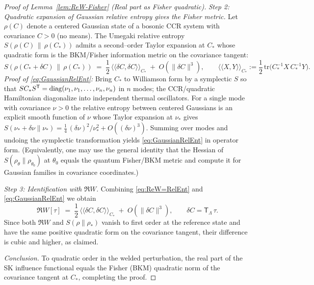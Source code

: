 \documentclass[10pt]{article}
\theoremstyle{definition}
\theoremstyle{plain}
\begin{document}
\begin{proof}[Proof of Lemma~\ref{lem:ReW-Fisher} (Real part as Fisher quadratic)]
\smallskip
\noindent
\emph{Step 2: Quadratic expansion of Gaussian relative entropy gives the Fisher metric.}
Let $\rho(C)$ denote a centered Gaussian state of a bosonic CCR system with covariance $C>0$ (no means). The Umegaki relative entropy $S(\rho(C)\,\|\,\rho(C_\ast))$ admits a second–order Taylor expansion at $C_\ast$ whose quadratic form is the BKM/Fisher information metric on the covariance tangent:
\begin{equation}
S(\rho(C_\ast+\delta C)\,\|\,\rho(C_\ast))
\;=\;\frac{1}{2}\,\big\langle\!\big\langle \delta C,\delta C\big\rangle\!\big\rangle_{C_\ast}
\;+\;O(\|\delta C\|^3),
\qquad
\big\langle\!\big\langle X,Y\big\rangle\!\big\rangle_{C_\ast}
:=\frac12\,\mathrm{tr}\!\big(C_\ast^{-1}X\,C_\ast^{-1}Y\big).
\label{eq:GaussianRelEnt}
\end{equation}
\emph{Proof of \eqref{eq:GaussianRelEnt}:}
Bring $C_\ast$ to Williamson form by a symplectic $S$ so that $S C_\ast S^{\sf T}=\mathrm{diag}(\nu_1,\nu_1,\dots,\nu_n,\nu_n)$ in $n$ modes; the CCR/quadratic Hamiltonian diagonalize into independent thermal oscillators. 
For a single mode with covariance $\nu>0$ the relative entropy between centered Gaussians is an explicit smooth function of $\nu$ whose Taylor expansion at $\nu_\ast$ gives
\(
S(\nu_\ast+\delta\nu\|\nu_\ast)=\tfrac{1}{4}\,(\delta\nu)^2/\nu_\ast^2+O((\delta\nu)^3).
\)
Summing over modes and undoing the symplectic transformation yields \eqref{eq:GaussianRelEnt} in operator form. (Equivalently, one may use the general identity that the Hessian of $S(\rho_\theta\|\rho_{\theta_0})$ at $\theta_0$ equals the quantum Fisher/BKM metric and compute it for Gaussian families in covariance coordinates.)

\smallskip
\noindent
\emph{Step 3: Identification with $\Re W$.}
Combining \eqref{eq:ReW=RelEnt} and \eqref{eq:GaussianRelEnt} we obtain
\[
\Re W[\tau]\;=\;\frac12\,\big\langle\!\big\langle \delta C,\delta C\big\rangle\!\big\rangle_{C_\ast}
\;+\;O(\|\delta C\|^3),
\qquad \delta C=\mathsf T_\Lambda\,\tau.
\]
Since both $\Re W$ and $S(\rho\|\rho_\ast)$ vanish to first order at the reference state and have the same positive quadratic form on the covariance tangent, their difference is cubic and higher, as claimed.

\smallskip
\noindent
\emph{Conclusion.}
To quadratic order in the welded perturbation, the real part of the SK influence functional equals the Fisher (BKM) quadratic norm of the covariance tangent at $C_\ast$, completing the proof.
\end{proof}
\end{document}
